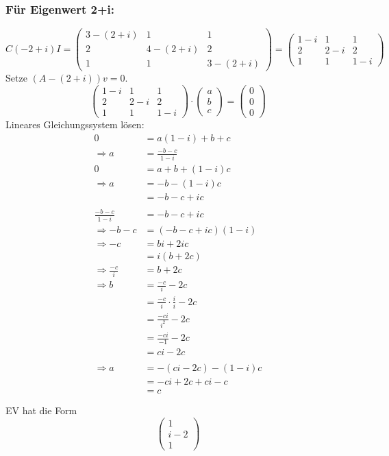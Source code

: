 \documentclass{article} %
\begin{document}
\subsubsection*{Für Eigenwert 2+i:}
\[
C  (-2+i) I = \begin{pmatrix}
3-(2+i)&1&1\\
2&4-(2+i)&2\\
1&1&3-(2+i)
\end{pmatrix}
 = \begin{pmatrix}
1-i&1&1\\
2&2-i&2\\
1&1&1-i
\end{pmatrix}
\]
Setze $(A -(2+i) )v = 0$.
\[
\begin{pmatrix}
1-i&1&1\\
2&2-i&2\\
1&1&1-i
\end{pmatrix} \cdot \begin{pmatrix}
a \\ b\\c
\end{pmatrix} = \begin{pmatrix}
0\\0\\0
\end{pmatrix}
\]
Lineares Gleichungssystem lösen:
\begin{align*}
            0 & = a(1-i)+b+c \\
\Rightarrow a & = \frac{-b-c}{1-i} \\
            0 & = a+b+(1-i)c \\
\Rightarrow a & = -b-(1-i)c\\
              & = -b-c+ic  \\ \\
\frac{-b-c}{1-i} & =  -b-c+ic  \\
\Rightarrow -b-c & = (-b-c+ic) (1-i) \\
\Rightarrow-c & = bi+2ic \\
              & = i(b+2c) \\
\Rightarrow \frac{-c}{i} & = b+2c \\
\Rightarrow b & = \frac{-c}{i} -2c  \\
              & = \frac{-c}{i} \cdot \frac{i}{i} -2c \\
              & = \frac{-ci}{i^2} -2c \\
              & = \frac{-ci}{-1} -2c \\
              & = ci -2c \\ \\
\Rightarrow a & = -(ci -2c)-(1-i)c\\
              & = -ci + 2c +ci -c \\
              & = c \\ \\
\end{align*}
EV hat die Form
\[
\begin{pmatrix}
1 \\i-2 \\1
\end{pmatrix}
\]
\end{document}
